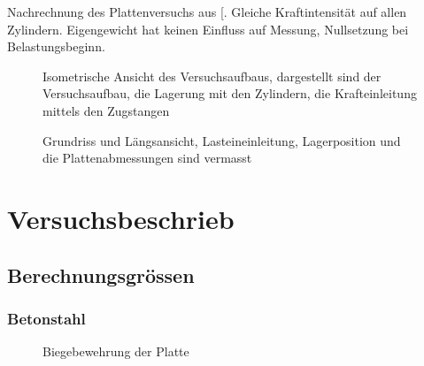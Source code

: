 \documentclass[
  11pt,
  letterpaper,
]{scrreprt}
\begin{document}
Nachrechnung des Plattenversuchs aus
{[}\citeproc{ref-thoma_plattenversuche_2010}{7}{]}. Gleiche
Kraftintensität auf allen Zylindern. Eigengewicht hat keinen Einfluss
auf Messung, Nullsetzung bei Belastungsbeginn.

\begin{figure}[H]


\caption{\label{fig-tho_aufbau_iso}Isometrische Ansicht des
Versuchsaufbaus, dargestellt sind der Versuchsaufbau, die Lagerung mit
den Zylindern, die Krafteinleitung mittels den Zugstangen}

\end{figure}%

\begin{figure}[H]


\caption{\label{fig-tho_aufbau_gr}Grundriss und Längsansicht,
Lasteineinleitung, Lagerposition und die Plattenabmessungen sind
vermasst}

\end{figure}%

\section{Versuchsbeschrieb}\label{versuchsbeschrieb}

\subsection{Berechnungsgrössen}\label{berechnungsgruxf6ssen}

\subsubsection{Betonstahl}\label{betonstahl}

\begin{figure}[H]


\caption{\label{fig-tho_biegebewehrung_iso}Biegebewehrung der Platte}

\end{figure}%
\end{document}
